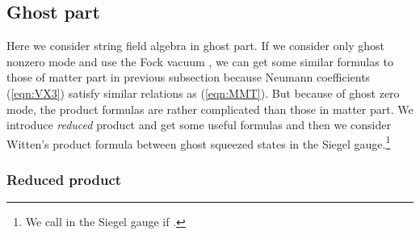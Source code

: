 \documentclass[12pt,a4paper]{article}
\begin{document}
\subsection{Ghost part}

Here we consider string field algebra in ghost part.
If we consider only ghost nonzero mode and use the Fock vacuum \coordHE{}, we can get some similar formulas to those of matter part in previous subsection because Neumann coefficients \coordHE{} (\ref{eqn:VX3}) satisfy similar relations as (\ref{eqn:MMT}).  But because of ghost zero mode, the \myHighlight{$\star$}\coordHE{} product formulas are rather complicated than those in matter part. We introduce  {\it reduced} product and get some useful formulas and then we consider Witten's \myHighlight{$\star$}\coordHE{} product formula between ghost squeezed states in the Siegel gauge.\footnote{
	We call \myHighlight{$|\Psi\rangle$}\coordHE{} in the Siegel gauge if \coordHE{}.
}

\subsubsection{Reduced product}
\end{document}
